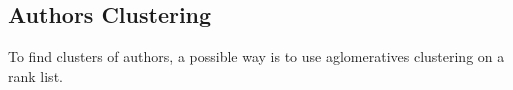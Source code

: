 \subsection{Authors Clustering}

To find clusters of authors, a possible way is to use aglomeratives clustering on a rank list.
